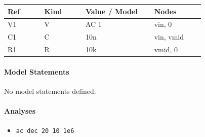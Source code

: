 \begin{longtable}{p{0.16\linewidth}p{0.18\linewidth}p{0.30\linewidth}p{0.22\linewidth}}
\textbf{Ref} & \textbf{Kind} & \textbf{Value / Model} & \textbf{Nodes}\\
\hline
V1 & V & AC 1 & vin, 0\\
C1 & C & 10n & vin, vmid\\
R1 & R & 10k & vmid, 0\\
\end{longtable}

\paragraph{Model Statements}
No model statements defined.

\paragraph{Analyses}
\begin{itemize}
  \item \texttt{ac dec 20 10 1e6}
\end{itemize}
